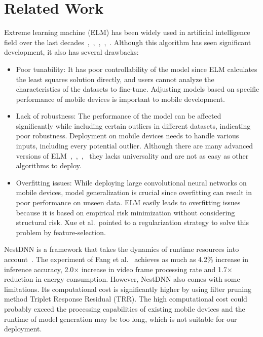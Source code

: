\documentclass[conference]{IEEEtran}
\begin{document}
\section{Related Work}\label{related_work}

Extreme learning machine (ELM) has been widely used in artificial intelligence field over the last decades~\cite{anton2021elm},~\cite{ding2014elmapp},~\cite{wang2022elmapp},~\cite{deng2015elmapp},~\cite{huang2006elmapp}. Although this algorithm has seen significant development, it also has several drawbacks: 
\begin{itemize}
	\item Poor tunability: It has poor controllability of the model since ELM calculates the least squares solution directly, and users cannot analyze the characteristics of the datasets to fine-tune. Adjusting models based on specific performance of mobile devices is important to mobile development.
	\item Lack of robustness: The performance of the model can be affected significantly while including certain outliers in different datasets, indicating poor robustness. Deployment on mobile devices needs to handle various inputs, including every potential outlier. Although there are many advanced versions of ELM~\cite{john2015advancedelm},~\cite{zhang2015advancedelm},~\cite{zhu2005advancedelm},~\cite{sun2017advancedelm} they lacks universality and are not as easy as other algorithms to deploy.
	\item Overfitting issues: While deploying large convolutional neural networks on mobile devices, model generalization is crucial since overfitting can result in poor performance on unseen data. ELM easily leads to overfitting issues because it is based on empirical risk minimization without considering structural risk. Xue et al.~\cite{ying2019overfit}pointed to a regularization strategy to solve this problem by feature-selection.
\end{itemize}	 

NestDNN is a framework that takes the dynamics of runtime resources into account~\cite{fang2018nestdnn}. The experiment of Fang et al.~\cite{fang2018nestdnn} achieves as much as 4.2\% increase in inference accuracy, 2.0× increase in video frame processing rate and 1.7× reduction in energy consumption. However, NestDNN also comes with some limitations. Its computational cost is significantly higher by using filter pruning method Triplet Response Residual (TRR). The high computational cost could probably exceed the processing capabilities of existing mobile devices and the runtime of model generation may be too long, which is not suitable for our deployment. 
\end{document}
